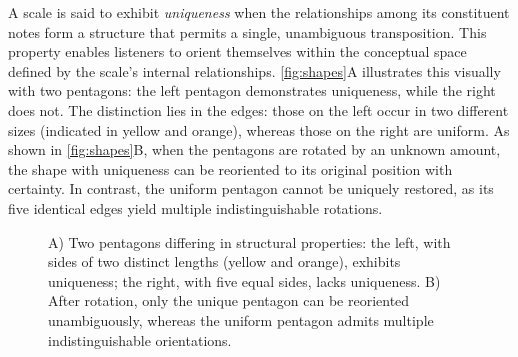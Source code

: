 \documentclass[10pt,twocolumn]{article}
\numberwithin{equation}{section} %
\begin{document}
A scale is said
to exhibit \textit{uniqueness} when the relationships among its constituent notes
form a structure that permits a single, unambiguous transposition. This
property enables listeners to orient themselves within the conceptual space
defined by the scale’s internal relationships. \autoref{fig:shapes}A illustrates this visually with two
pentagons: the left pentagon demonstrates uniqueness, while the right does not.
The distinction lies in the edges: those on the left occur in two different
sizes (indicated in yellow and orange), whereas those on the right are uniform.
As shown in \autoref{fig:shapes}B, when the pentagons are rotated by an
unknown amount, the shape with uniqueness can be reoriented to its original
position with certainty.
In contrast, the uniform pentagon cannot be uniquely
restored, as its five identical edges yield multiple indistinguishable
rotations.

\begin{figure}[htbp]
    \centering
    \caption{A) Two
pentagons differing in structural properties: the left, with sides of two
distinct lengths (yellow and orange), exhibits uniqueness; the right, with five
equal sides, lacks uniqueness. B) After rotation, only the unique pentagon can
be reoriented unambiguously, whereas the uniform pentagon admits multiple
indistinguishable orientations.}
    \label{fig:shapes}
\end{figure}
\end{document}
